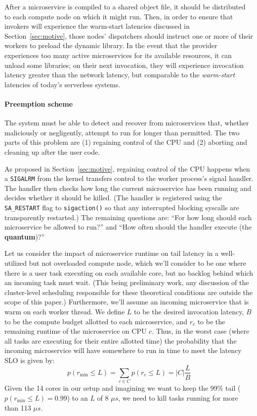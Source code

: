 After a microservice is compiled to a shared object file, it should be distributed to
each compute node on which it might run.  Then, in order to ensure that invokers will
experience the warm-start latencies discussed in Section~\ref{sec:motive}, those
nodes' dispatchers should instruct one or more of their workers to preload the
dynamic library.  In the event that the provider experiences too many active
microservices for its available resources, it can unload some libraries; on their
next invocation, they will experience invocation latency greater than the network
latency, but comparable to the \textit{warm-start} latencies of today's serverless
systems.

\paragraph{Preemption scheme}
The system must be able to detect and recover from microservices that, whether
maliciously or negligently, attempt to run for longer than permitted.  The two parts
of this problem are (1) regaining control of the CPU and (2) aborting and cleaning up
after the user code.

As proposed in Section~\ref{sec:motive}, regaining control of the CPU happens when a
\texttt{SIGALRM} from the kernel transfers control to the worker process's signal
handler.  The handler then checks how long the current microservice has been running
and decides whether it should be killed.  (The handler is registered using the
\texttt{SA\_RESTART} flag to \texttt{sigaction()} so that any interrupted blocking
syscalls are transparently restarted.)  The remaining questions are:  ``For how
long should each microservice be allowed to run?'' and ``How often should the handler
execute (the \textbf{quantum})?''

Let us consider the impact of microservice runtime on tail latency in a well-utilized
but not overloaded compute node, which we'll consider to be one where there is a user
task executing on each available core, but no backlog behind which an incoming task
must wait.  (This being preliminary work, any discussion of the cluster-level
scheduling responsible for these theoretical conditions are outside the scope of
this paper.)  Furthermore, we'll assume an incoming microservice that is warm on each
worker thread.  We define $L$ to be the desired invocation latency, $B$ to be the
compute budget allotted to each microservice, and $r_c$ to be the remaining runtime
of the microservice on CPU $c$.  Thus, in the worst case (where all tasks are
executing for their entire allotted time) the probability that the incoming
microservice will have somewhere to run in time to meet the latency SLO is given by:
\begin{equation}
p(r_\textrm{min} \le L) = \sum\limits_{c \in C} p(r_c \le L) = \big| C \big| \frac{L}{B}
\end{equation}
Given the 14 cores in our setup and imagining we want to keep the 99\% tail
($p(r_\textrm{min} \le L) = 0.99$) to an $L$ of 8 $\mu{}s$, we need to kill tasks
running for more than 113 $\mu{}s$.

